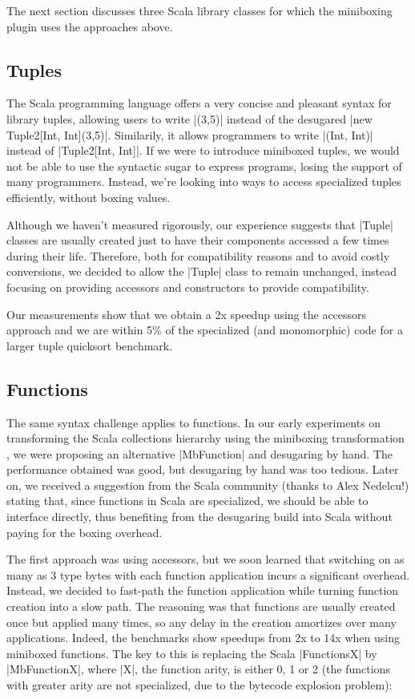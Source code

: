 The next section discusses three Scala library classes for which the miniboxing plugin uses the approaches above.

\subsection{Tuples}
\label{sec:tuples}

The Scala programming language offers a very concise and pleasant syntax for library tuples, allowing users to write |(3,5)| instead of the desugared |new Tuple2[Int, Int](3,5)|. Similarily, it allows programmers to write |(Int, Int)| instead of |Tuple2[Int, Int]|. If we were to introduce miniboxed tuples, we would not be able to use the syntactic sugar to express programs, losing the support of many programmers. Instead, we're looking into ways to access specialized tuples efficiently, without boxing values.

Although we haven't measured rigorously, our experience suggests that |Tuple| classes are usually created just to have their components accessed a few times during their life. Therefore, both for compatibility reasons and to avoid costly conversions, we decided to allow the |Tuple| class to remain unchanged, instead focusing on providing accessors and constructors to provide compatibility.

Our measurements show that we obtain a 2x speedup using the accessors approach and we are within 5\% of the specialized (and monomorphic) code for a larger tuple quicksort benchmark.

\subsection{Functions}
\label{sec:functions}

The same syntax challenge applies to functions. In our early experiments on transforming the Scala collections hierarchy using the miniboxing transformation \cite{miniboxing-linkedlist}, we were proposing an alternative |MbFunction| and desugaring by hand. The performance obtained was good, but desugaring by hand was too tedious. Later on, we received a suggestion from the Scala community (thanks to Alex Nedelcu!) stating that, since functions in Scala are specialized, we should be able to interface directly, thus benefiting from the desugaring build into Scala without paying for the boxing overhead.

The first approach was using accessors, but we soon learned that switching on as many as 3 type bytes with each function application incurs a significant overhead. Instead, we decided to fast-path the function application while turning function creation into a slow path. The reasoning was that functions are usually created once but applied many times, so any delay in the creation amortizes over many applications. Indeed, the benchmarks show speedups from 2x to 14x when using miniboxed functions. The key to this is replacing the Scala |FunctionsX| by |MbFunctionX|, where |X|, the function arity, is either 0, 1 or 2 (the functions with greater arity are not specialized, due to the bytecode explosion problem):

